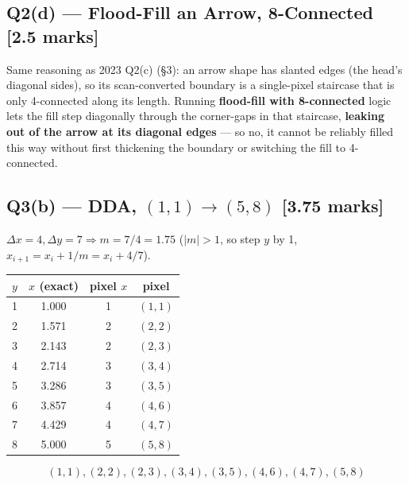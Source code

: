 \documentclass[12pt, a4paper]{article}
\newenvironment{solutionbox}{\begin{mdframed}[style=solutionframe]}{\end{mdframed}}
\newenvironment{answerbox}{\begin{mdframed}[style=answerframe]}{\end{mdframed}}
\begin{document}
\subsection*{Q2(d) --- Flood-Fill an Arrow, 8-Connected [2.5 marks]}
\begin{answerbox}
Same reasoning as 2023 Q2(c) (\S3): an arrow shape has slanted edges (the head's diagonal sides), so its scan-converted boundary is a single-pixel staircase that is only 4-connected along its length. Running \textbf{flood-fill with 8-connected} logic lets the fill step diagonally through the corner-gaps in that staircase, \textbf{leaking out of the arrow at its diagonal edges} --- so no, it cannot be reliably filled this way without first thickening the boundary or switching the fill to 4-connected.
\end{answerbox}

\subsection*{Q3(b) --- DDA, $(1,1)\to(5,8)$ [3.75 marks]}
$\Delta x=4,\Delta y=7\Rightarrow m=7/4=1.75$ ($|m|>1$, so step $y$ by 1, $x_{i+1}=x_i+1/m=x_i+4/7$).
\begin{solutionbox}
\begin{center}
\begin{tabular}{cccc}
\toprule
$y$ & $x$ (exact) & pixel $x$ & pixel \\
\midrule
1 & 1.000 & 1 & $(1,1)$ \\
2 & 1.571 & 2 & $(2,2)$ \\
3 & 2.143 & 2 & $(2,3)$ \\
4 & 2.714 & 3 & $(3,4)$ \\
5 & 3.286 & 3 & $(3,5)$ \\
6 & 3.857 & 4 & $(4,6)$ \\
7 & 4.429 & 4 & $(4,7)$ \\
8 & 5.000 & 5 & $(5,8)$ \\
\bottomrule
\end{tabular}
\end{center}
\end{solutionbox}
\begin{answerbox}
$$(1,1),(2,2),(2,3),(3,4),(3,5),(4,6),(4,7),(5,8)$$
\end{answerbox}
\end{document}
